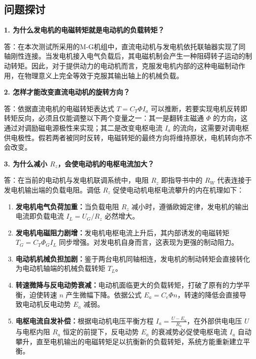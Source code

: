 \begin{framed}
{			\subsection{问题探讨}
			\textbf{1. 为什么发电机的电磁转矩就是电动机的负载转矩？}
			
			答：在本次测试所采用的M-G机组中，直流电动机与发电机依托联轴器实现了同轴刚性连接。当发电机接入电气负载后，其电磁机制会产生一种阻碍转子运动的制动转矩。因此，对于提供动力的电动机而言，克服发电机内部的这种电磁制动作用，在物理意义上完全等效于克服其输出轴上的机械负载。
			
			\vspace{1em}
			
			\textbf{2. 怎样才能改变直流电动机的旋转方向？}
			
			答：依据直流电机的电磁转矩表达式 $T = C_T \Phi I_a$ 可以推断，若要实现电机反转即转矩反向，必须且仅能调整以下两个变量之一：其一是翻转主磁通 $\Phi$ 的方向，这通过对调励磁电源极性来实现；其二是改变电枢电流 $I_a$ 的流向，这需要对调电枢供电极性。假若两者被同时反转，电磁转矩的最终方向将维持原状，电机转向亦不会改变。
			
			\vspace{1em}
			
			\textbf{3. 为什么减小 $R_z$，会使电动机的电枢电流加大？}
			
			答：在当前的电动机与发电机联调系统中，电阻 $R_z$ 即指导书中的 $R_W$ 代表连接于发电机输出端的负载电阻。调低 $R_z$ 促使电动机电枢电流攀升的内在机理如下：
			\begin{enumerate}
				\item \textbf{发电机电气负荷加重：}当负载电阻 $R_z$ 减小时，遵循欧姆定律，发电机的输出电流即负载电流 $I_L = U_G / R_z$ 必然增大。
				\item \textbf{发电机电磁阻力剧增：}发电机电枢电流上升后，其内部诱发的电磁转矩 $T_G = C_T \Phi_G I_L$ 同步增强。对发电机自身而言，这表现为更强的制动阻力。
				\item \textbf{电动机机械负担加剧：}鉴于两台电机同轴相连，发电机的制动转矩会直接转化为电动机轴端的机械负载转矩 $T_L$。
				\item \textbf{转速微降与反电动势衰减：}电动机面临更大的负载转矩，打破了原有的力学平衡，迫使转速 $n$ 产生微幅下降。依据公式 $E_a = C_e \Phi n$，转速的降低会直接导致电动机反电动势 $E_a$ 减弱。
				\item \textbf{电枢电流自发补偿：}根据电动机电压平衡方程 $I_a = \frac{U - E_a}{R_a}$，在外部供电电压 $U$ 与电枢内阻 $R_a$ 恒定的前提下，反电动势 $E_a$ 的衰减势必促使电枢电流 $I_a$ 自动攀升，直至电机输出的电磁转矩足以抗衡新的负载转矩，系统方能重新建立平衡。
			\end{enumerate}
			
}
\end{framed}
